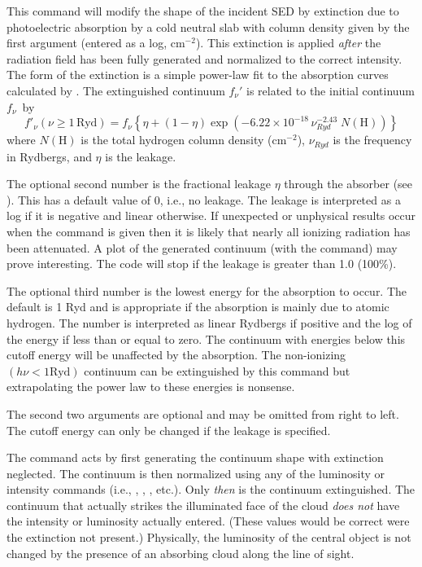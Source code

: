 This command will modify the shape of the
incident SED by extinction due
to photoelectric absorption by a cold neutral slab with column density given
by the first argument (entered as a log, cm$^{-2}$).
This extinction is applied \emph{after} the
radiation field has been fully generated and normalized
to the correct intensity.
The form of the extinction is a simple power-law fit to the
absorption curves calculated by \citet{Cruddace1974}.
The extinguished continuum $f_\nu'$ is
related to the initial continuum $f_\nu$~by
\begin{equation}
f'_\nu  \left( {\nu  \ge 1\,{\mathrm{Ryd}}} \right) = f_\nu  \left\{ {\eta
+ \left( {1 - \eta } \right)\exp \left( { - 6.22 \times 10^{ - 18} \,\nu
_{Ryd}^{ - 2.43} \;N\left( {\mathrm{H}} \right)} \right)} \right\}%
\end{equation}
where $N(\mathrm{H})$ is the total hydrogen column density (cm$^{-2}$), $\nu_{Ryd}$ is the frequency
in Rydbergs, and $\eta$ is the leakage.

The optional second number is the fractional leakage $\eta$ through the
absorber (see \citealp{FerlandMushotzky1982}).
This has a default value of
0, i.e., no leakage.
The leakage is interpreted as a log if it is negative
and linear otherwise.
If unexpected or unphysical results occur when the
 command is given then it is likely that
nearly all ionizing
radiation has been attenuated.
A plot of the generated continuum (with
the  command) may prove interesting.  The code will stop if
the leakage is greater than 1.0 (100\%).

The optional third number is the lowest energy for the absorption to
occur.
The default is 1 Ryd and is appropriate if the absorption is mainly
due to atomic hydrogen.
The number is interpreted as linear Rydbergs if positive
and the log of the energy if less than or equal to zero.
The continuum
with energies below this cutoff energy will be unaffected by the absorption.
The non-ionizing $(h\nu < 1 \mathrm{Ryd})$ continuum can be extinguished by this command
but extrapolating the power law to these energies is nonsense.

The second two arguments are optional and may be omitted from right to
left.
The cutoff energy can only be changed if the leakage is specified.

The command acts by first generating the continuum shape with extinction
neglected.
The continuum is then normalized using any of the luminosity
or intensity commands
(i.e., , ,
, etc.).
Only \emph{then} is the continuum extinguished.
The continuum that actually strikes
the illuminated face of the cloud \emph{does not}
have the intensity or luminosity
actually entered.  (These values would be correct were the extinction not
present.)  Physically, the luminosity of the central object is not changed
by the presence of an absorbing cloud along the line of sight.

